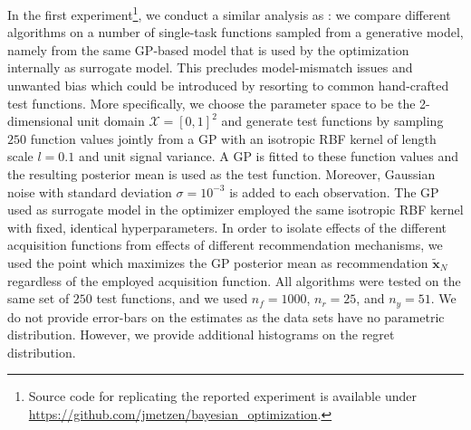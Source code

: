 \documentclass[10pt,letterpaper]{article} %
\begin{document}
In the first experiment\footnote{Source code for replicating the reported experiment
is available under \url{https://github.com/jmetzen/bayesian_optimization}.}, 
we conduct a similar analysis as \citet[Section
3.1]{hennig_entropy_2012}: we compare different algorithms on a number of
single-task functions sampled from a generative model, namely from the same GP-based model
that is used by the optimization internally as surrogate model. This precludes
model-mismatch issues and unwanted bias which could be introduced by resorting
to common hand-crafted test functions. More specifically, we choose the
parameter space to be the 2-dimensional unit domain $\mathcal{X} = [0, 1]^2$ and generate test
functions by sampling $250$ function values jointly from a GP with an isotropic RBF kernel
of length scale $l = 0.1$ and unit signal variance. A GP is
fitted to these function values and the resulting posterior mean is used as the
test function. Moreover, Gaussian noise with standard deviation $\sigma =
10^{-3}$ is added to each observation. The GP used as surrogate model in the optimizer employed the same 
isotropic RBF kernel with fixed, identical hyperparameters. 
In order to isolate effects of the different acquisition functions from effects of different
recommendation mechanisms, we used the point which maximizes the GP posterior
mean as recommendation $\mathbf{\tilde x}_N$ regardless of the employed acquisition function.
All algorithms were tested on the same
set of $250$ test functions, and we used $n_f=1000$, $n_r=25$, and $n_y=51$.
We do not provide error-bars on the estimates as the data sets have no parametric distribution. 
However, we provide additional histograms on the regret distribution.
\end{document}
